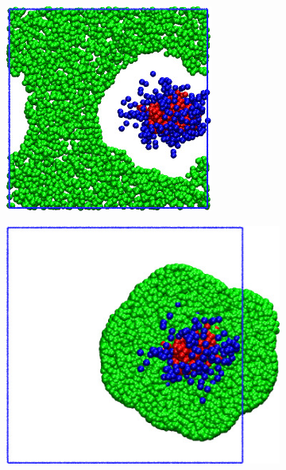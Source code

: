 \begin{figure}[b]
  \centering
  \begin{subfigure}{0.20\textwidth}
    \includegraphics[height=0.9\textwidth]{AddToSystem-A-ld.jpg}
    \caption{}
  \end{subfigure}
  \hspace{15pt}
  \begin{subfigure}{0.20\textwidth}
    \includegraphics[height=0.9\textwidth]{AddToSystem-A-hd.jpg}

\end{subfigure}
\end{figure}
